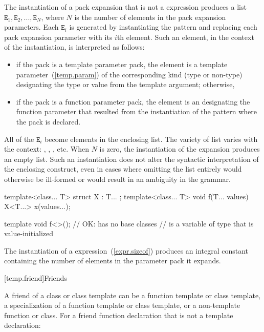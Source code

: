 \exitexample

\pnum
The instantiation of a pack expansion
that is not a  expression
produces a
list
$\mathtt{E}_1, \mathtt{E}_2, ..., \mathtt{E}_N$,
where
$N$ is the number of elements in the pack expansion parameters. Each
$\mathtt{E}_i$ is generated by instantiating the pattern and
replacing each pack expansion parameter with its $i$th element.
Such an element, in the context of the instantiation, is interpreted as
follows:

\begin{itemize}
\item
if the pack is a template parameter pack, the element is a template
parameter~(\ref{temp.param}) of the corresponding kind (type or
non-type) designating the type or value from the template
argument; otherwise,

\item
if the pack is a function parameter pack, the element is an
designating the function parameter that resulted from
the instantiation of the pattern where the pack is declared.
\end{itemize}

All of the $\mathtt{E}_i$ become elements in the enclosing list.
\enternote The variety of list varies with the context:
,
,
, etc.\exitnote
When $N$ is zero, the instantiation of the expansion produces an empty list.
Such an instantiation does not alter the syntactic interpretation of the
enclosing construct, even in cases where omitting the list entirely would
otherwise be ill-formed or would result in an ambiguity in the grammar.
\enterexample
\begin{codeblock}
template<class... T> struct X : T... { };
template<class... T> void f(T... values) {
  X<T...> x(values...);
}

template void f<>();  // OK:  has no base classes
                      //  is a variable of type  that is value-initialized
\end{codeblock}
\exitexample

\pnum
The instantiation of a  expression~(\ref{expr.sizeof}) produces
an integral constant containing the number of elements in the parameter pack
it expands.

[temp.friend]{Friends}

\pnum
{}%
A friend of a class or class template can be a function template or
class template, a specialization of a function template or class
template, or a non-template function or class.
For a friend function declaration that is not a template declaration:

